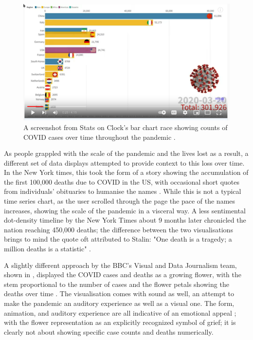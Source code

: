 \documentclass[article]{jdssv}\usepackage[]{graphicx}\usepackage[]{color}
\begin{document}
\begin{figure}
\centering
\includegraphics[width=.8\linewidth]{Figures_Web/Bar-chart-race-screenshot}
\caption{A screenshot from Stats on Clock's bar chart race showing counts of COVID cases over time throughout the pandemic \citep{clockCoronavirusCasesBar2022}.}\label{fig:barchart-race}
\end{figure}

As people grappled with the scale of the pandemic and the lives lost as a result, a different set of data displays attempted to provide context to this loss over time. In the New York times, this took the form of a story showing the accumulation of the first 100,000 deaths due to COVID in the US, with occasional short quotes from individuals' obituaries to humanise the names \citep{barryRemembering1000002020}. While this is not a typical time series chart, as the user scrolled through the page the pace of the names increases, showing the scale of the pandemic in a visceral way. A less sentimental dot-density timeline by the New York Times about 9 months later chronicled the nation reaching 450,000 deaths; the difference between the two visualisations brings to mind the quote oft attributed to Stalin: "One death is a tragedy; a million deaths is a statistic" \citep{investigatorSingleDeathTragedy2016}.

A slightly different approach by the BBC's Visual and Data Journalism team, shown in , displayed the COVID cases and deaths as a growing flower, with the stem proportional to the number of cases and the flower petals showing the deaths over time \citep{thebbcvisualanddatajournalismteamCoronavirusHowCan2020}. The visualisation comes with sound as well, an attempt to make the pandemic an auditory experience as well as a visual one. The form, animation, and auditory experience are all indicative of an emotional appeal \citep{kostelnick_re-emergence_2016,dignazio_data_2020}; with the flower representation as an explicitly recognized symbol of grief; it is clearly not about showing specific case counts and deaths numerically.
\end{document}
